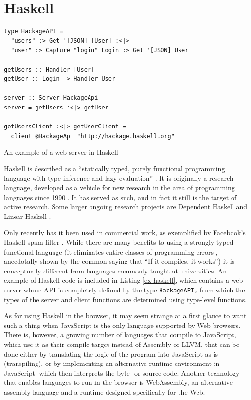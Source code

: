 \documentclass[english,zadani,odsaz]{fitthesis}
\begin{document}
\section{Haskell}
\label{sec:orgd7d41fa}
\begin{listing}[!bp]
\begin{verbatim}
type HackageAPI =
  "users" :> Get '[JSON] [User] :<|>
  "user" :> Capture "login" Login :> Get '[JSON] User

getUsers :: Handler [User]
getUser :: Login -> Handler User

server :: Server HackageApi
server = getUsers :<|> getUser

getUsersClient :<|> getUserClient =
  client @HackageApi "http://hackage.haskell.org"
\end{verbatim}
\caption{An example of a web server in Haskell \label{ex-haskell}}
\end{listing}

Haskell is described as a ``statically typed, purely functional programming
language with type inference and lazy evaluation'' \cite{jones2003haskell}. It is
originally a research language, developed as a vehicle for new research in the
area of programming languages since 1990 \cite{haskell_history}. It has served as
such, and in fact it still is the target of active research. Some larger ongoing
research projects are Dependent Haskell \cite{eisenberg2016dependent} and Linear
Haskell \cite{bernardy2017linear}.

Only recently has it been used in commercial work, as exemplified by Facebook's
Haskell spam filter \cite{marlow2015fighting}. While there are many benefits to
using a strongly typed functional language (it eliminates entire classes of
programming errors \cite{Nanz_2015}, anecdotally shown by the common saying that
``If it compiles, it works'') it is conceptually different from languages commonly
taught at universities. An example of Haskell code is included in
Listing \ref{ex-haskell}, which contains a web server whose API is completely
defined by the type \texttt{HackageAPI,} from which the types of the server and client
functions are determined using type-level functions.

As for using Haskell in the browser, it may seem strange at a first glance to
want such a thing when JavaScript is the only language supported by Web
browsers. There is, however, a growing number of languages that compile to
JavaScript, which use it as their compile target instead of Assembly or LLVM,
that can be done either by translating the logic of the program into JavaScript
as is (transpiling), or by implementing an alternative runtime environment in
JavaScript, which then interprets the byte- or source-code. Another technology
that enables languages to run in the browser is WebAssembly, an alternative
assembly language and a runtime designed specifically for the Web.
\end{document}
